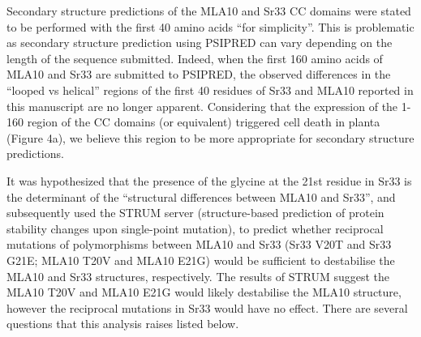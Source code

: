 \documentclass[10pt]{article}
\begin{document}
\par\null

Secondary structure predictions of the MLA10 and Sr33 CC domains were
stated to be performed with the first 40 amino acids ``for simplicity''.
This is problematic as secondary structure prediction using PSIPRED can
vary depending on the length of the sequence submitted. Indeed, when the
first 160 amino acids of MLA10 and Sr33 are submitted to PSIPRED, the
observed differences in the ``looped vs helical'' regions of the first
40 residues of Sr33 and MLA10 reported in this manuscript are no longer
apparent. Considering that the expression of the 1-160 region of the CC
domains (or equivalent) triggered cell death in planta (Figure 4a), we
believe this region to be more appropriate for secondary structure
predictions.

\par\null

It was hypothesized that the presence of the glycine at the 21st residue
in Sr33 is the determinant of the ``structural differences between MLA10
and Sr33'', and subsequently used the STRUM server (structure-based
prediction of protein stability changes upon single-point mutation), to
predict whether reciprocal mutations of polymorphisms between MLA10 and
Sr33 (Sr33 V20T and Sr33 G21E; MLA10 T20V and MLA10 E21G) would be
sufficient to destabilise the MLA10 and Sr33 structures, respectively.
The results of STRUM suggest the MLA10 T20V and MLA10 E21G would likely
destabilise the MLA10 structure, however the reciprocal mutations in
Sr33 would have no effect. There are several questions that this
analysis raises listed below.

\par\null
\end{document}
